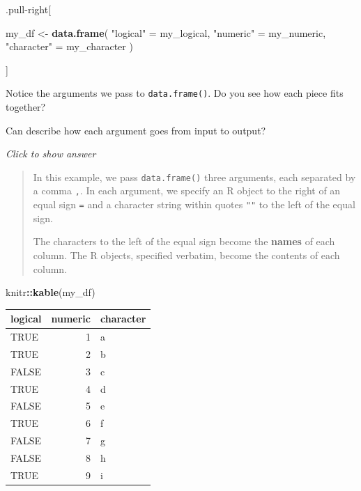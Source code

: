 \documentclass[
]{book}
\newenvironment{Shaded}{\begin{snugshade}}{\end{snugshade}}
\newcommand{\FunctionTok}[1]{\textcolor[rgb]{0.13,0.29,0.53}{\textbf{#1}}}
\newcommand{\NormalTok}[1]{#1}
\newcommand{\OtherTok}[1]{\textcolor[rgb]{0.56,0.35,0.01}{#1}}
\newcommand{\SpecialCharTok}[1]{\textcolor[rgb]{0.81,0.36,0.00}{\textbf{#1}}}
\newcommand{\StringTok}[1]{\textcolor[rgb]{0.31,0.60,0.02}{#1}}
\begin{document}
.pull-right{[}

\begin{Shaded}
\begin{Highlighting}[]
\NormalTok{my\_df }\OtherTok{\textless{}{-}} \FunctionTok{data.frame}\NormalTok{(}
  \StringTok{"logical"} \OtherTok{=}\NormalTok{ my\_logical,}
  \StringTok{"numeric"} \OtherTok{=}\NormalTok{ my\_numeric,}
  \StringTok{"character"} \OtherTok{=}\NormalTok{ my\_character}
\NormalTok{)}
\end{Highlighting}
\end{Shaded}

{]}

Notice the arguments we pass to \texttt{data.frame()}. Do you see how each piece fits together?

Can describe how each argument goes from input to output?

\emph{Click to show answer}

\begin{quote}
In this example, we pass \texttt{data.frame()} three arguments, each separated by a comma \texttt{,}.
In each argument, we specify an R object to the right of an equal sign \texttt{=} and
a character string within quotes \texttt{""} to the left of the equal sign.

The characters to the left of the equal sign become the \textbf{names} of each column. The R objects, specified verbatim, become the contents of each column.
\end{quote}

\begin{Shaded}
\begin{Highlighting}[]
\NormalTok{knitr}\SpecialCharTok{::}\FunctionTok{kable}\NormalTok{(my\_df)}
\end{Highlighting}
\end{Shaded}

\begin{tabular}{l|r|l}
\hline
logical & numeric & character\\
\hline
TRUE & 1 & a\\
\hline
TRUE & 2 & b\\
\hline
FALSE & 3 & c\\
\hline
TRUE & 4 & d\\
\hline
FALSE & 5 & e\\
\hline
TRUE & 6 & f\\
\hline
FALSE & 7 & g\\
\hline
FALSE & 8 & h\\
\hline
TRUE & 9 & i\\
\hline
\end{tabular}
\end{document}
